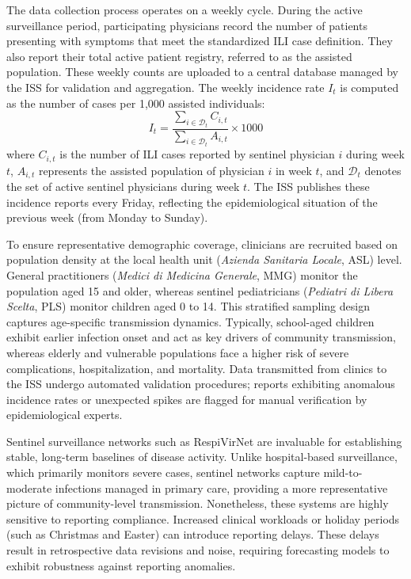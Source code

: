 The data collection process operates on a weekly cycle. During the active surveillance period, participating physicians record the number of patients presenting with symptoms that meet the standardized ILI case definition. They also report their total active patient registry, referred to as the assisted population. These weekly counts are uploaded to a central database managed by the ISS for validation and aggregation. The weekly incidence rate $I_t$ is computed as the number of cases per 1,000 assisted individuals:
\begin{equation}
I_t = \frac{\sum_{i \in \mathcal{D}_t} C_{i, t}}{\sum_{i \in \mathcal{D}_t} A_{i, t}} \times 1000
\end{equation}
where $C_{i, t}$ is the number of ILI cases reported by sentinel physician $i$ during week $t$, $A_{i, t}$ represents the assisted population of physician $i$ in week $t$, and $\mathcal{D}_t$ denotes the set of active sentinel physicians during week $t$. The ISS publishes these incidence reports every Friday, reflecting the epidemiological situation of the previous week (from Monday to Sunday).

To ensure representative demographic coverage, clinicians are recruited based on population density at the local health unit (\textit{Azienda Sanitaria Locale}, ASL) level. General practitioners (\textit{Medici di Medicina Generale}, MMG) monitor the population aged 15 and older, whereas sentinel pediatricians (\textit{Pediatri di Libera Scelta}, PLS) monitor children aged 0 to 14. This stratified sampling design captures age-specific transmission dynamics. Typically, school-aged children exhibit earlier infection onset and act as key drivers of community transmission, whereas elderly and vulnerable populations face a higher risk of severe complications, hospitalization, and mortality. Data transmitted from clinics to the ISS undergo automated validation procedures; reports exhibiting anomalous incidence rates or unexpected spikes are flagged for manual verification by epidemiological experts.

Sentinel surveillance networks such as RespiVirNet are invaluable for establishing stable, long-term baselines of disease activity. Unlike hospital-based surveillance, which primarily monitors severe cases, sentinel networks capture mild-to-moderate infections managed in primary care, providing a more representative picture of community-level transmission. Nonetheless, these systems are highly sensitive to reporting compliance. Increased clinical workloads or holiday periods (such as Christmas and Easter) can introduce reporting delays. These delays result in retrospective data revisions and noise, requiring forecasting models to exhibit robustness against reporting anomalies.


